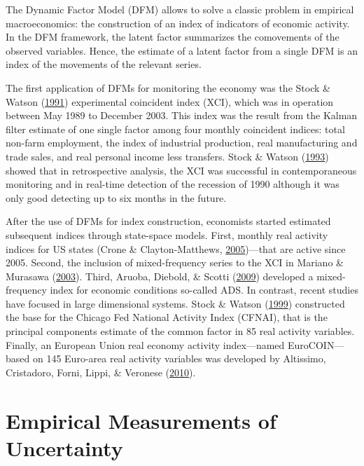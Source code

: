 \documentclass[12pt,twoside]{reedthesis}
\begin{document}
The Dynamic Factor Model (DFM) allows to solve a classic problem in empirical macroeconomics: the construction of an index of indicators of economic activity. In the DFM framework, the latent factor summarizes the comovements of the observed variables. Hence, the estimate of a latent factor from a single DFM is an index of the movements of the relevant series.

The first application of DFMs for monitoring the economy was the Stock \& Watson (\protect\hyperlink{ref-stocwats:1991}{1991}) experimental coincident index (XCI), which was in operation between May 1989 to December 2003. This index was the result from the Kalman filter estimate of one single factor among four monthly coincident indices: total non-farm employment, the index of industrial production, real manufacturing and trade sales, and real personal income less transfers. Stock \& Watson (\protect\hyperlink{ref-stocwats:1993}{1993}) showed that in retrospective analysis, the XCI was successful in contemporaneous monitoring and in real-time detection of the recession of 1990 although it was only good detecting up to six months in the future.

After the use of DFMs for index construction, economists started estimated subsequent indices through state-space models. First, monthly real activity indices for US states (Crone \& Clayton-Matthews, \protect\hyperlink{ref-cronclay:2005}{2005})---that are active since 2005. Second, the inclusion of mixed-frequency series to the XCI in Mariano \& Murasawa (\protect\hyperlink{ref-marimura:2003}{2003}). Third, Aruoba, Diebold, \& Scotti (\protect\hyperlink{ref-aruoetal:2009}{2009}) developed a mixed-frequency index for economic conditions so-called ADS. In contrast, recent studies have focused in large dimensional systems. Stock \& Watson (\protect\hyperlink{ref-stocwats:1999}{1999}) constructed the base for the Chicago Fed National Activity Index (CFNAI), that is the principal components estimate of the common factor in 85 real activity variables. Finally, an European Union real economy activity index---named EuroCOIN---based on 145 Euro-area real activity variables was developed by Altissimo, Cristadoro, Forni, Lippi, \& Veronese (\protect\hyperlink{ref-altietal:2010}{2010}).

\hypertarget{empirical-measurements-of-uncertainty}{%
\section{Empirical Measurements of Uncertainty}\label{empirical-measurements-of-uncertainty}}
\end{document}
